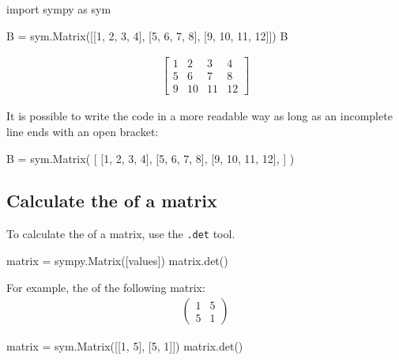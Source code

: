 \begin{pyin}
import sympy as sym

B = sym.Matrix([[1, 2, 3, 4], [5, 6, 7, 8], [9, 10, 11, 12]])
B
\end{pyin}




\begin{equation*}
\begin{split}\displaystyle \left[\begin{matrix}1 & 2 & 3 & 4\\5 & 6 & 7 & 8\\9 & 10 & 11 & 12\end{matrix}\right]\end{split}
\end{equation*}

\begin{note}
It is possible to write the code in a more readable way as long as an incomplete
line ends with an open bracket:
\end{note}


\begin{pyin}
B = sym.Matrix(
    [
        [1, 2, 3, 4],
        [5, 6, 7, 8],
        [9, 10, 11, 12],
    ]
)
\end{pyin}


\subsection{Calculate the  of a matrix}
\label{\detokenize{tools-for-mathematics/04-matrices/how/main:calculate-the-determinant-of-a-matrix}}

To calculate the  of a matrix, use the \texttt{.det} tool.

\begin{api}
matrix = sympy.Matrix([values])
matrix.det()
\end{api}



For example, the  of the following matrix:
\begin{equation*}
\begin{split}
    \begin{pmatrix}
    1 & 5\\
    5 & 1
    \end{pmatrix}
\end{split}
\end{equation*}



\begin{pyin}
matrix = sym.Matrix([[1, 5], [5, 1]])
matrix.det()
\end{pyin}




